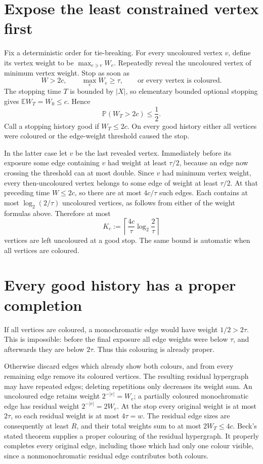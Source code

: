 \documentclass[11pt]{article}
\begin{document}
\section*{Expose the least constrained vertex first}
Fix a deterministic order for tie-breaking. For every uncoloured vertex $v$, define its vertex weight to be $\max_{e\ni v}W_e$. Repeatedly reveal the uncoloured vertex of minimum vertex weight. Stop as soon as
\[
 W>2c,\qquad \max_eW_e\ge\tau,\qquad\text{or every vertex is coloured}.
\]
The stopping time $T$ is bounded by $|X|$, so elementary bounded optional stopping gives $\mathbb EW_T=W_0\le c$. Hence
\[
 \mathbb P(W_T>2c)\le\frac12.
\tag{1}
\]
Call a stopping history good if $W_T\le2c$. On every good history either all vertices were coloured or the edge-weight threshold caused the stop.

In the latter case let $v$ be the last revealed vertex. Immediately before its exposure some edge containing $v$ had weight at least $\tau/2$, because an edge now crossing the threshold can at most double. Since $v$ had minimum vertex weight, every then-uncoloured vertex belongs to some edge of weight at least $\tau/2$. At that preceding time $W\le2c$, so there are at most $4c/\tau$ such edges. Each contains at most $\log_2(2/\tau)$ uncoloured vertices, as follows from either of the weight formulas above. Therefore at most
\[
 K_c:=\left\lceil\frac{4c}{\tau}\log_2\frac2\tau\right\rceil
\tag{2}
\]
vertices are left uncoloured at a good stop. The same bound is automatic when all vertices are coloured.

\section*{Every good history has a proper completion}
If all vertices are coloured, a monochromatic edge would have weight $1/2>2\tau$. This is impossible: before the final exposure all edge weights were below $\tau$, and afterwards they are below $2\tau$. Thus this colouring is already proper.

Otherwise discard edges which already show both colours, and from every remaining edge remove its coloured vertices. The resulting residual hypergraph may have repeated edges; deleting repetitions only decreases its weight sum. An uncoloured edge retains weight $2^{-|e|}=W_e$; a partially coloured monochromatic edge has residual weight $2^{-|e|}=2W_e$. At the stop every original weight is at most $2\tau$, so each residual weight is at most $4\tau=w$. The residual edge sizes are consequently at least $R$, and their total weights sum to at most $2W_T\le4c$. Beck's stated theorem supplies a proper colouring of the residual hypergraph. It properly completes every original edge, including those which had only one colour visible, since a nonmonochromatic residual edge contributes both colours.
\end{document}
